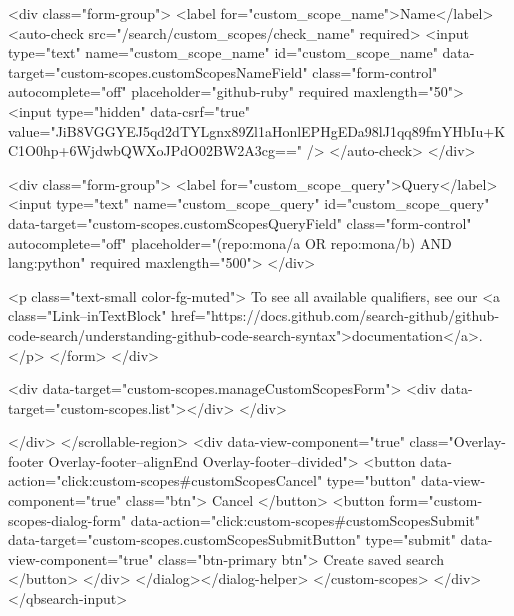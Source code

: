           <div class="form-group">
            <label for="custom_scope_name">Name</label>
            <auto-check src="/search/custom_scopes/check_name" required>
              <input
                type="text"
                name="custom_scope_name"
                id="custom_scope_name"
                data-target="custom-scopes.customScopesNameField"
                class="form-control"
                autocomplete="off"
                placeholder="github-ruby"
                required
                maxlength="50">
              <input type="hidden" data-csrf="true" value="JiB8VGGYEJ5qd2dTYLgnx89Zl1aHonlEPHgEDa98lJ1qq89fmYHbIu+KC1O0hp+6WjdwbQWXoJPdO02BW2A3cg==" />
            </auto-check>
          </div>

          <div class="form-group">
            <label for="custom_scope_query">Query</label>
            <input
              type="text"
              name="custom_scope_query"
              id="custom_scope_query"
              data-target="custom-scopes.customScopesQueryField"
              class="form-control"
              autocomplete="off"
              placeholder="(repo:mona/a OR repo:mona/b) AND lang:python"
              required
              maxlength="500">
          </div>

          <p class="text-small color-fg-muted">
            To see all available qualifiers, see our <a class="Link--inTextBlock" href="https://docs.github.com/search-github/github-code-search/understanding-github-code-search-syntax">documentation</a>.
          </p>
</form>        </div>

        <div data-target="custom-scopes.manageCustomScopesForm">
          <div data-target="custom-scopes.list"></div>
        </div>

</div>
      </scrollable-region>
      <div data-view-component="true" class="Overlay-footer Overlay-footer--alignEnd Overlay-footer--divided">          <button data-action="click:custom-scopes#customScopesCancel" type="button" data-view-component="true" class="btn">    Cancel
</button>
          <button form="custom-scopes-dialog-form" data-action="click:custom-scopes#customScopesSubmit" data-target="custom-scopes.customScopesSubmitButton" type="submit" data-view-component="true" class="btn-primary btn">    Create saved search
</button>
</div>
</dialog></dialog-helper>
    </custom-scopes>
  </div>
</qbsearch-input>


